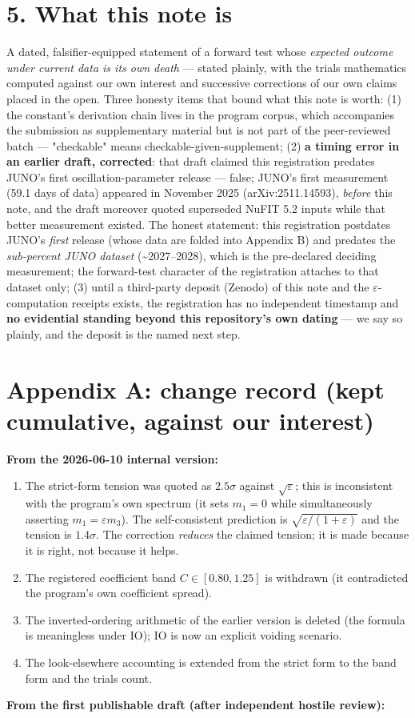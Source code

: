 \documentclass[11pt]{article}
\begin{document}
\section*{5. What this note is}
A dated, falsifier-equipped statement of a forward test whose \emph{expected outcome under current data is its own death} — stated plainly, with the trials mathematics computed against our own interest and successive corrections of our own claims placed in the open.  Three honesty items that bound what this note is worth: (1) the constant's derivation chain lives in the program corpus, which accompanies the submission as supplementary material but is not part of the peer-reviewed batch — "checkable" means checkable-given-supplement; (2) \textbf{a timing error in an earlier draft, corrected}: that draft claimed this registration predates JUNO's first oscillation-parameter release — false; JUNO's first measurement (59.1 days of data) appeared in November 2025 (arXiv:2511.14593), \emph{before} this note, and the draft moreover quoted superseded NuFIT 5.2 inputs while that better measurement existed.  The honest statement: this registration postdates JUNO's \emph{first} release (whose data are folded into Appendix B) and predates the \emph{sub-percent JUNO dataset} (\textasciitilde{}2027–2028), which is the pre-declared deciding measurement; the forward-test character of the registration attaches to that dataset only; (3) until a third-party deposit (Zenodo) of this note and the $\varepsilon$-computation receipts exists, the registration has no independent timestamp and \textbf{no evidential standing beyond this repository's own dating} — we say so plainly, and the deposit is the named next step.

\section*{Appendix A: change record (kept cumulative, against our interest)}
\textbf{From the 2026-06-10 internal version:}

\begin{enumerate}
\item The strict-form tension was quoted as $2.5\sigma$ against $\sqrt\varepsilon$; this is inconsistent with the program's own spectrum (it sets $m_1 = 0$ while simultaneously asserting $m_1 = \varepsilon m_3$).  The self-consistent prediction is $\sqrt{\varepsilon/(1+\varepsilon)}$ and the tension is $1.4\sigma$.  The correction \emph{reduces} the claimed tension; it is made because it is right, not because it helps.
\item The registered coefficient band $C \in [0.80, 1.25]$ is withdrawn (it contradicted the program's own coefficient spread).
\item The inverted-ordering arithmetic of the earlier version is deleted (the formula is meaningless under IO); IO is now an explicit voiding scenario.
\item The look-elsewhere accounting is extended from the strict form to the band form and the trials count.
\end{enumerate}
\textbf{From the first publishable draft (after independent hostile review):}
\end{document}
